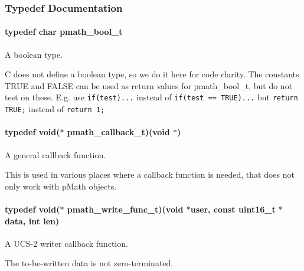 \subsubsection{Typedef Documentation}
\hypertarget{group__general__types_gc92090cb0b56345d6c379ed2341d4ef4}{
\paragraph[{pmath\_\-bool\_\-t}]{\setlength{\rightskip}{0pt plus 5cm}typedef char {\bf pmath\_\-bool\_\-t}}\hfill}
\label{group__general__types_gc92090cb0b56345d6c379ed2341d4ef4}


A boolean type. 

C does not define a boolean type, so we do it here for code clarity. The constants TRUE and FALSE can be used as return values for pmath\_\-bool\_\-t, but do not test on these. E.g. use {\tt if(test)...} instead of {\tt if(test == TRUE)...} but {\tt return TRUE;} instead of {\tt return 1;} \hypertarget{group__general__types_ge1a454657f18f3cc54508adeccccbcbc}{
\paragraph[{pmath\_\-callback\_\-t}]{\setlength{\rightskip}{0pt plus 5cm}typedef void($\ast$ {\bf pmath\_\-callback\_\-t})(void $\ast$)}\hfill}
\label{group__general__types_ge1a454657f18f3cc54508adeccccbcbc}


A general callback function. 

This is used in various places where a callback function is needed, that does not only work with pMath objects. \hypertarget{group__general__types_g781a2e0445795bb4e091470fb20497cc}{
\paragraph[{pmath\_\-write\_\-func\_\-t}]{\setlength{\rightskip}{0pt plus 5cm}typedef void($\ast$ {\bf pmath\_\-write\_\-func\_\-t})(void $\ast$user, const uint16\_\-t $\ast$data, int len)}\hfill}
\label{group__general__types_g781a2e0445795bb4e091470fb20497cc}


A UCS-2 writer callback function. 

The to-be-written data is not zero-terminated. 